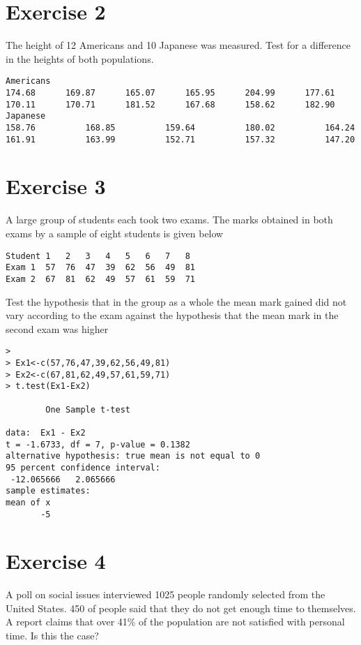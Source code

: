 \documentclass[a4paper,12pt]{article}
\begin{document}
\begin{itemize}
\begin{verbatim}
\end{verbatim}
\section{Exercise 2} 
The height of 12 Americans and 10 Japanese was measured. Test for a difference in the heights of both populations.
\begin{verbatim}
Americans
174.68   	169.87 	   	165.07    	165.95 		204.99 		177.61 	
170.11 	 	170.71 	   	181.52 		167.68 		158.62 		182.90
Japanese
158.76  		168.85  		159.64  		180.02  		164.24
161.91  		163.99  		152.71  		157.32  		147.20
\end{verbatim}


\section{Exercise 3}

A large group of students each took two exams. The marks obtained in both exams by a sample of eight students is given below

\begin{verbatim}
Student	1	2	3	4	5	6	7	8
Exam 1	57	76	47	39	62	56	49	81
Exam 2	67	81	62	49	57	61	59	71
\end{verbatim}
Test the hypothesis that in the group as a whole the mean mark gained did not vary according to the exam against the hypothesis that the mean mark in the second exam was higher
\begin{verbatim}
>
> Ex1<-c(57,76,47,39,62,56,49,81)
> Ex2<-c(67,81,62,49,57,61,59,71)
> t.test(Ex1-Ex2)

        One Sample t-test

data:  Ex1 - Ex2
t = -1.6733, df = 7, p-value = 0.1382
alternative hypothesis: true mean is not equal to 0
95 percent confidence interval:
 -12.065666   2.065666
sample estimates:
mean of x
       -5
\end{verbatim}

\section{Exercise 4}
A poll on social issues interviewed 1025 people randomly selected from the United States. 450 of people said that they do not get enough time to themselves. A report claims that over 41\% of the population are not satisfied with personal time. Is this the case?

\begin{verbatim}


\end{verbatim}
\end{itemize}
\end{document}

